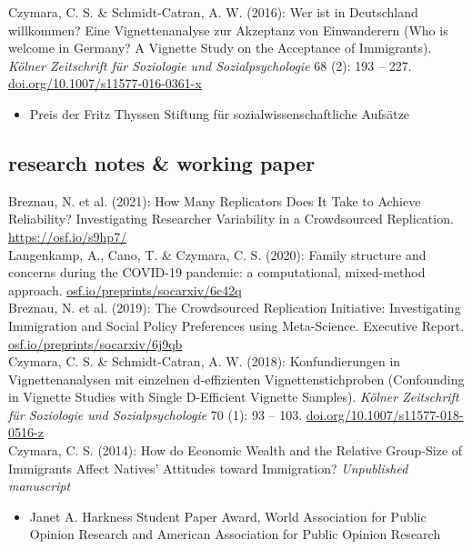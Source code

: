 \documentclass[11pt, a4paper]{article}
\newcommand{\years}[1]{\marginnote{~~#1}}
\begin{document}
\years{1}Czymara, C. S. \& Schmidt-Catran, A. W. (2016): Wer ist in Deutschland willkommen? Eine Vignettenanalyse zur Akzeptanz von Einwanderern (Who is welcome in Germany? A Vignette Study on the Acceptance of Immigrants). \textit{K\"olner Zeitschrift f\"ur Soziologie und Sozialpsychologie} 68 (2): 193 -- 227. \href{https://doi.org/10.1007/s11577-016-0361-x}{doi.org/10.1007/s11577-016-0361-x}
\begin{itemize}
	\item Preis der Fritz Thyssen Stiftung für sozialwissenschaftliche Aufsätze
\end{itemize}
\hspace{1em}

\subsection*{research notes \& working paper}
\years{5}Breznau, N. et al. (2021): How Many Replicators Does It Take to Achieve Reliability? Investigating Researcher Variability in a Crowdsourced Replication.\\ \href{https://osf.io/s9hp7/}{https://osf.io/s9hp7/}\\[1em]
\years{4}Langenkamp, A., Cano, T. \& Czymara, C. S. (2020): Family structure and concerns during the \textsc{COVID}-19 pandemic: a computational, mixed-method approach. \href{https://osf.io/preprints/socarxiv/6c42q/}{osf.io/preprints/socarxiv/6c42q}\\[1em]
\years{3}Breznau, N. et al. (2019): The Crowdsourced Replication Initiative: Investigating Immigration and Social Policy Preferences using Meta-Science. Executive Report. \href{https://osf.io/preprints/socarxiv/6j9qb}{osf.io/preprints/socarxiv/6j9qb}\\[1em]
\years{2}Czymara, C. S. \& Schmidt-Catran, A. W. (2018): Konfundierungen in Vignettenanalysen mit einzelnen d-effizienten Vignettenstichproben (Confounding in Vignette Studies with Single D-Efficient Vignette Samples). \textit{K\"olner Zeitschrift f\"ur Soziologie und Sozialpsychologie} 70 (1): 93 -- 103. \href{https://doi.org/10.1007/s11577-018-0516-z}{doi.org/10.1007/s11577-018-0516-z}\\[1em]
\years{1}Czymara, C. S. (2014): How do Economic Wealth and the Relative Group-Size of Immigrants Affect Natives' Attitudes toward Immigration? \textit{Unpublished manuscript}
\begin{itemize}
	\item Janet A. Harkness Student Paper Award, World Association for Public Opinion Research and American Association for Public Opinion Research
\end{itemize}
\end{document}
